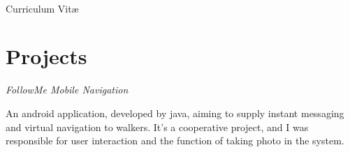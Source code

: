 \documentclass[10pt]{article} %
\begin{document}
\color{text1} %


\par{\\ %
{\color{headings} Curriculum {Vit\ae}\\[15pt]\par} %
	

\begin{minipage}[t]{0.52\textwidth} %
\vspace{0pt} %
	

\section{Projects} 


{\par}

{\raggedright\large \textit{FollowMe Mobile Navigation}\\[5pt]}
\normalsize{An android application, developed by java, aiming to supply instant messaging and virtual navigation to walkers. It's a cooperative project, and I was responsible for user interaction and the function of taking photo in the system.}\\


{\par}


\end{minipage}}
\end{document}
